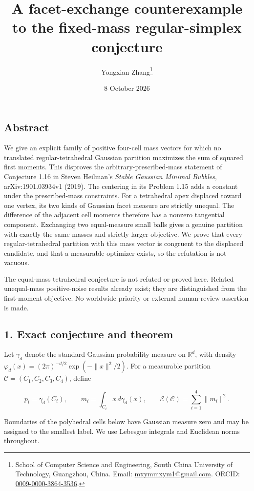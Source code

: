 \documentclass[
  11pt,
]{article}
\title{A facet-exchange counterexample to the fixed-mass regular-simplex
conjecture}
\author{Yongxian Zhang\thanks{School of Computer Science and Engineering,
South China University of Technology, Guangzhou, China.
Email: \href{mailto:mxymmxym1@gmail.com}{mxymmxym1@gmail.com}.
ORCID: \href{https://orcid.org/0009-0000-3864-3536}{0009-0000-3864-3536}.}}
\date{8 October 2026}
\begin{document}
\maketitle

\subsection{Abstract}\label{abstract}

We give an explicit family of positive four-cell mass vectors for which
no translated regular-tetrahedral Gaussian partition maximizes the sum
of squared first moments. This disproves the arbitrary-prescribed-mass
statement of Conjecture 1.16 in Steven Heilman's \emph{Stable Gaussian
Minimal Bubbles}, arXiv:1901.03934v1 (2019). The centering in its
Problem 1.15 adds a constant under the prescribed-mass constraints. For
a tetrahedral apex displaced toward one vertex, its two kinds of
Gaussian facet measure are strictly unequal. The difference of the
adjacent cell moments therefore has a nonzero tangential component.
Exchanging two equal-measure small balls gives a genuine partition with
exactly the same masses and strictly larger objective. We prove that
every regular-tetrahedral partition with this mass vector is congruent
to the displaced candidate, and that a measurable optimizer exists, so
the refutation is not vacuous.

The equal-mass tetrahedral conjecture is not refuted or proved here.
Related unequal-mass positive-noise results already exist; they are
distinguished from the first-moment objective. No worldwide priority or
external human-review assertion is made.

\subsection{1. Exact conjecture and
theorem}\label{exact-conjecture-and-theorem}

Let \(\gamma_d\) denote the standard Gaussian probability measure on
\(\mathbb R^d\), with density
\(\varphi_d(x)=(2\pi)^{-d/2}\exp(-\|x\|^2/2)\). For a measurable
partition \(\mathcal C=(C_1,C_2,C_3,C_4)\), define

\[
 p_i=\gamma_d(C_i),\qquad m_i=\int_{C_i}x\,d\gamma_d(x),
 \qquad \mathcal E(\mathcal C)=\sum_{i=1}^4\|m_i\|^2.       \tag{1}
\]

Boundaries of the polyhedral cells below have Gaussian measure zero and
may be assigned to the smallest label. We use Lebesgue integrals and
Euclidean norms throughout.
\end{document}
